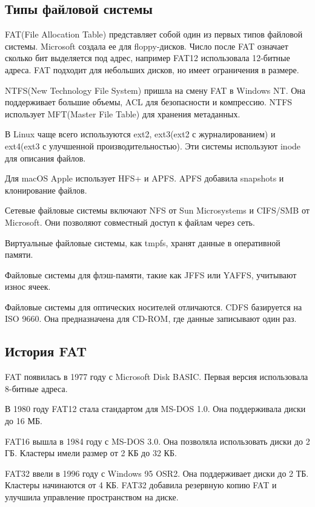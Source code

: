 \subsection{Типы файловой системы}

FAT(File Allocation Table) представляет собой один из первых типов файловой системы. Microsoft создала ее для floppy-дисков. Число после FAT означает сколько бит выделяется под адрес, например FAT12 использовала 12-битные адреса. FAT подходит для небольших дисков, но имеет ограничения в размере.

NTFS(New Technology File System) пришла на смену FAT в Windows NT. Она поддерживает большие объемы, ACL для безопасности и компрессию. NTFS использует MFT(Master File Table) для хранения метаданных.

В Linux чаще всего используются ext2, ext3(ext2 с журналированием) и ext4(ext3 с улучшенной производительностью). Эти системы используют inode для описания файлов.

Для macOS Apple использует HFS+ и APFS. APFS добавила snapshots и клонирование файлов.

Сетевые файловые системы включают NFS от Sun Microsystems и CIFS/SMB от Microsoft. Они позволяют совместный доступ к файлам через сеть.

Виртуальные файловые системы, как tmpfs, хранят данные в оперативной памяти.

Файловые системы для флэш-памяти, такие как JFFS или YAFFS, учитывают износ ячеек.

Файловые системы для оптических носителей отличаются. CDFS базируется на ISO 9660. Она предназначена для CD-ROM, где данные записывают один раз.

\subsection{История FAT}

FAT появилась в 1977 году с Microsoft Disk BASIC. Первая версия использовала 8-битные адреса.

В 1980 году FAT12 стала стандартом для MS-DOS 1.0. Она поддерживала диски до 16 МБ.

FAT16 вышла в 1984 году с MS-DOS 3.0. Она позволяла использовать диски до 2 ГБ. Кластеры имели размер от 2 КБ до 32 КБ.

FAT32 ввели в 1996 году с Windows 95 OSR2. Она поддерживает диски до 2 ТБ. Кластеры начинаются от 4 КБ. FAT32 добавила резервную копию FAT и улучшила управление пространством на диске.


